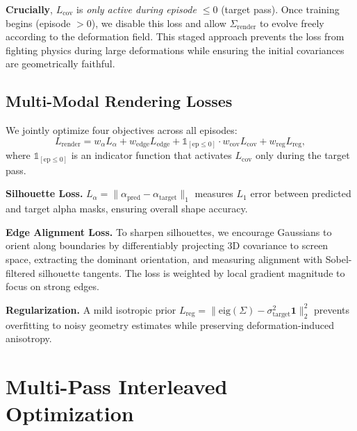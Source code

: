     \textbf{Crucially}, $L_{\text{cov}}$ is \emph{only active during episode $\leq 0$} (target pass). Once training begins (episode $> 0$), we disable this loss and allow $\Sigma_{\text{render}}$ to evolve freely according to the deformation field. This staged approach prevents the loss from fighting physics during large deformations while ensuring the initial covariances are geometrically faithful.

\subsection{Multi-Modal Rendering Losses}

    We jointly optimize four objectives across all episodes:
    \begin{equation}
    \label{eq:render_total}
    L_{\text{render}} = w_\alpha L_\alpha + w_{\text{edge}} L_{\text{edge}}
    + \mathbb{1}_{[\text{ep}\leq 0]} \cdot w_{\text{cov}} L_{\text{cov}} + w_{\text{reg}} L_{\text{reg}},
    \end{equation}
    where $\mathbb{1}_{[\text{ep}\leq 0]}$ is an indicator function that activates $L_{\text{cov}}$ only during the target pass.
    
\noindent\textbf{Silhouette Loss.}
    $L_\alpha = \| \alpha_{\text{pred}} - \alpha_{\text{target}} \|_1$ measures 
    $L_1$ error between predicted and target alpha masks, ensuring overall shape accuracy.

\noindent\textbf{Edge Alignment Loss.}
    To sharpen silhouettes, we encourage Gaussians to orient along boundaries by differentiably projecting 3D covariance to screen space, extracting the dominant orientation, and measuring alignment with Sobel-filtered silhouette tangents. The loss is weighted by local gradient magnitude to focus on strong edges.
        
\noindent\textbf{Regularization.}
    A mild isotropic prior 
    $L_{\text{reg}} = \| \text{eig}(\Sigma) - \sigma_{\text{target}}^2 \mathbf{1} \|_2^2$ 
    prevents overfitting to noisy geometry estimates while preserving deformation-induced anisotropy.

\section{Multi-Pass Interleaved Optimization}
\label{sec:optimization}

